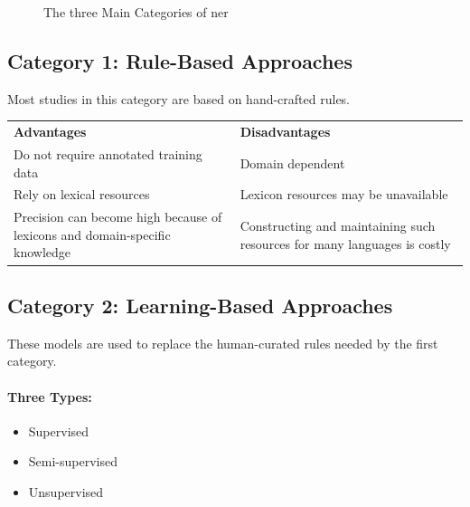 \begin{figure}[H]
    \caption{The three Main Categories of \gls{ner}}
\end{figure}


\subsection*{Category 1: Rule-Based Approaches}
Most studies in this category are based on hand-crafted rules.

\begin{mytable}
    \begin{tabular}{p{} p{}}
        \textbf{Advantages} & \textbf{Disadvantages} \\

        Do not require annotated training data &
        Domain dependent \\

        Rely on lexical resources &
        Lexicon resources may be unavailable \\

        Precision can become high because of lexicons and domain-specific knowledge &
        Constructing and maintaining such resources for many languages is costly \\
    \end{tabular}
    \caption{Advantages and disadvantages of rule-based approaches.}
    \label{tab:advantages_disadvantages}
\end{mytable}

\subsection*{Category 2: Learning-Based Approaches}
These models are used to replace the human-curated rules needed by the first
category.

\paragraph{Three Types:}
\begin{itemize}
    \item Supervised
    \item Semi-supervised
    \item Unsupervised
\end{itemize}

